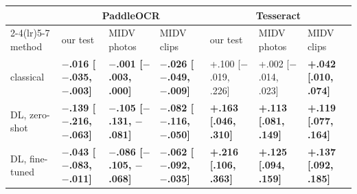 \begin{tabular}{lllllll}
\toprule
 & \multicolumn{3}{c}{PaddleOCR} & \multicolumn{3}{c}{Tesseract} \\
\cmidrule(lr){2-4}\cmidrule(lr){5-7}
method & our test & MIDV photos & MIDV clips & our test & MIDV photos & MIDV clips \\
\midrule
classical & \textbf{$-$.016 [$-$.035, $-$.003]} & \textbf{$-$.001 [$-$.003, .000]} & \textbf{$-$.026 [$-$.049, $-$.009]} & +.100 [$-$.019, .226] & +.002 [$-$.014, .023] & \textbf{+.042 [.010, .074]} \\
DL, zero-shot & \textbf{$-$.139 [$-$.216, $-$.063]} & \textbf{$-$.105 [$-$.131, $-$.081]} & \textbf{$-$.082 [$-$.116, $-$.050]} & \textbf{+.163 [.046, .310]} & \textbf{+.113 [.081, .149]} & \textbf{+.119 [.077, .164]} \\
DL, fine-tuned & \textbf{$-$.043 [$-$.083, $-$.011]} & \textbf{$-$.086 [$-$.105, $-$.068]} & \textbf{$-$.062 [$-$.092, $-$.035]} & \textbf{+.216 [.106, .363]} & \textbf{+.125 [.094, .159]} & \textbf{+.137 [.092, .185]} \\
\bottomrule
\end{tabular}
